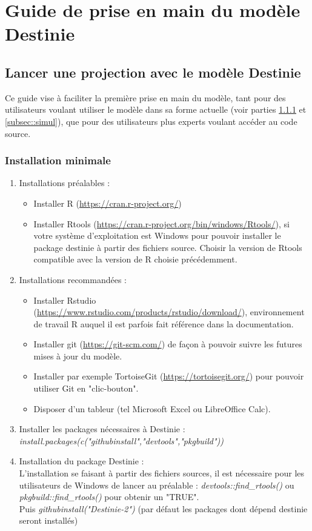 \section{Guide de prise en main du modèle Destinie}
\subsection{Lancer une projection avec le modèle Destinie}
Ce guide vise à faciliter la première prise en main du modèle, tant pour des utilisateurs voulant utiliser le modèle dans sa forme actuelle (voir parties \ref{subsec::instmin} et \ref{subsec::simul}), que pour des utilisateurs plus experts voulant accéder au code source.\\
\subsubsection{Installation minimale}
\label{subsec::instmin}
\begin{enumerate}
\item Installations préalables : \\
\begin{itemize}
\item Installer	R (\url{https://cran.r-project.org/}) 
\item Installer	Rtools (\url{https://cran.r-project.org/bin/windows/Rtools/}), si votre système d'exploitation est 				Windows pour pouvoir installer le package destinie à partir des fichiers source. Choisir la version de Rtools compatible 		avec la version de R choisie précédemment. 
\end{itemize}
\item Installations recommandées : \\
\begin{itemize}
\item Installer	Rstudio (\url{https://www.rstudio.com/products/rstudio/download/}), environnement de travail R auquel il est parfois fait référence dans la documentation.
\item Installer git (\url{https://git-scm.com/}) de façon à pouvoir suivre les futures mises à jour du modèle.
\item Installer par exemple TortoiseGit (\url{https://tortoisegit.org/}) pour pouvoir utiliser Git en "clic-bouton".
\item Disposer d'un tableur (tel Microsoft Excel ou LibreOffice Calc).
\end{itemize}
\item Installer les packages nécessaires à Destinie :\\
\textit{install.packages(c("githubinstall","devtools","pkgbuild"))}
\item Installation du package Destinie :\\
L'installation se faisant à partir des fichiers sources, il est nécessaire pour les utilisateurs de Windows de lancer au préalable : \textit{devtools::find\_rtools()} ou \textit{pkgbuild::find\_rtools()} pour obtenir un "TRUE".\\
Puis \textit{githubinstall("Destinie-2")} (par défaut les packages dont dépend destinie seront installés)
\end{enumerate}

